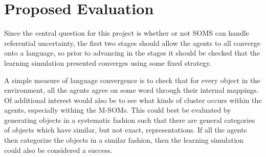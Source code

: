 \documentclass[11pt]{article}
\begin{document}
\section{Proposed Evaluation}
Since the central question for this project is whether or not SOMS can handle
referential uncertainty, the first two stages should allow the agents to all
converge onto a language, so prior to advancing in the stages it should be
checked that the learning simulation presented converges using some fixed
strategy.

A simple measure of language convergence is to check
that for every object in the environment, all the agents agree on some word
through their internal mappings.  Of additional interest would also be to see
what kinds of cluster occurs within the agents, especially withing the M-SOMs.
This could best be evaluated by generating objects in a systematic fashion such
that there are general categories of objects which have similar, but not exact,
representations.  If all the agents then categorize the objects in a similar
fashion, then the learning simulation could also be considered a success.



\end{document}
